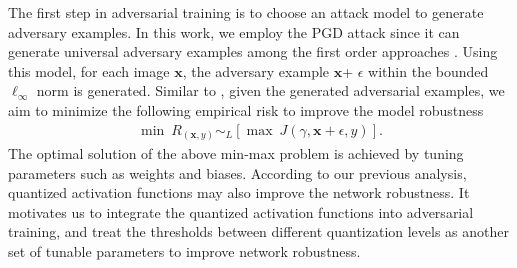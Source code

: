 \documentclass{article}
\def \x{\mathbf{x}}
\begin{document}
The first step in adversarial training is to choose an attack model to generate adversary examples. In this work, we employ the PGD attack since it can generate universal adversary examples among the first order approaches \cite{madry2017towards}. Using this model, for each image $\x$, the adversary example $\x$+ $\epsilon$ within the bounded $\ell_\infty$ norm is generated. %
Similar to \cite{kurakin2016adversarial, madry2017towards,wald1945statistical}, given the generated adversarial examples, we aim to minimize the following empirical risk to improve the model robustness
\begin{eqnarray}
\label{eqn:5}
{\min}\ R_{(\x,y)}\sim_L[\max \ J(\gamma,\x+\epsilon,y)].
\end{eqnarray}
The optimal solution of the above min-max problem is achieved by tuning parameters such as weights and biases. According to our previous analysis, quantized activation functions may also improve the network robustness. It motivates us to integrate the quantized activation functions into adversarial training, and treat the thresholds between different quantization levels as another set of tunable parameters to improve network robustness.

\end{document}
